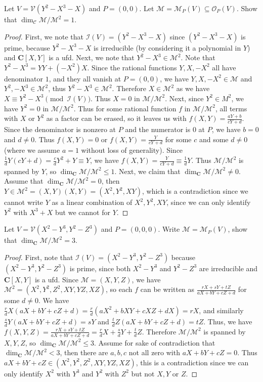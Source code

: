 \documentclass[11pt]{book}
\begin{document}
\begin{problem}
Let $V=\mathcal{V}(Y^2-X^3-X)$ and $P=(0,0)$. Let $\mathcal M=\mathcal{M}_P(V)\subseteq\mathcal{O}_P(V)$. Show that $\dim_{\mathcal C}\mathcal{M}/\mathcal{M}^2=1$.
\begin{proof}
First, we note that $\mathcal I(V)=(Y^2-X^3-X)$ since $(Y^2-X^3-X)$ is prime, because $Y^2-X^3-X$ is irreducible (by considering it a polynomial in $Y$) and $\mathbf C[X,Y]$ is a ufd. Next, we note that $Y^2-X^3\in\mathcal{M}^2$. Note that $Y^2-X^3=YY+(-X^2)X$. Since the rational functions $Y,X,-X^2$ all have denominator $1$, and they all vanish at $P=(0,0)$, we have $Y,X,-X^2\in\mathcal{M}$ and $Y^2,-X^3\in\mathcal{M}^2$, thus $Y^2-X^3\in\mathcal{M}^2$. Therefore $X\in \mathcal{M}^2$ as we have $X\equiv Y^2-X^3\pmod{\mathcal I(V)}$. Thus $X=0$ in $\mathcal{M}/\mathcal{M}^2$. Next, since $Y^2\in M^2$, we have $Y^2=0$ in $\mathcal{M}/\mathcal{M}^2$.  Thus for some rational function $f$ in $\mathcal{M}/\mathcal{M}^2$, all terms with $X$ or $Y^2$ as a factor can be erased, so it leaves us with $f(X,Y)=\frac{aY+b}{cY+d}$. Since the denominator is nonzero at $P$ and the numerator is $0$ at $P$, we have $b=0$ and $d\ne 0$. Thus $f(X,Y)=0$ or $f(X,Y)=\frac{Y}{cY+d}$ for some $c$ and some $d\ne 0$ (where we assume $a=1$ without loss of generality). Since $\frac{1}{d}Y(cY+d)=\frac{c}{d}Y^2+Y\equiv Y$, we have $f(X,Y)=\frac{Y}{cY+d}\equiv \frac{1}{d}Y$. Thus $\mathcal{M}/\mathcal{M}^2$ is spanned by $Y$, so $\dim_{\mathbf C}\mathcal{M}/\mathcal{M}^2\le 1$. Next, we claim that $\dim_{\mathbf C}\mathcal{M}/\mathcal{M}^2\ne 0$. Assume that $\dim_{\mathbf C}\mathcal{M}/\mathcal{M}^2= 0$, then $Y\in\mathcal{M}^2=(X,Y)(X,Y)=(X^2,Y^2,XY)$, which is a contradiction since we cannot write $Y$ as a linear combination of $X^2,Y^2,XY$, since we can only identify $Y^2$ with $X^3+X$ but we cannot for $Y$.
\end{proof}
\end{problem}
\begin{problem}
Let $V=\mathcal{V}(X^2-Y^3,Y^2-Z^3)$ and $P=(0,0,0)$. Write $\mathcal{M}=\mathcal M_P(V)$, show that $\dim_{\mathbf C}\mathcal{M}/\mathcal{M}^2=3$.
\begin{proof}
First, note that $\mathcal{I}(V)=(X^2-Y^3,Y^2-Z^3)$ because $(X^2-Y^3,Y^2-Z^3)$ is prime, since both $X^2-Y^3$ and $Y^2-Z^3$ are irreducible and $\mathbf C[X,Y]$ is a ufd. Since $\mathcal{M}=(X,Y,Z)$, we have $\mathcal{M}^2=(X^2,Y^2,Z^2,XY,YZ,XZ)$, so each $f$ can be written as $\frac{rX+sY+tZ}{aX+bY+cZ+d}$ for some $d\ne 0$. We have $\frac{r}{d}X(aX+bY+cZ+d)=\frac{r}{d}(aX^2+bXY+cXZ+dX)=rX$, and similarly $\frac{s}{d}Y(aX+bY+cZ+d)=sY$ and $\frac{t}{d}Z(aX+bY+cZ+d)=tZ$. Thus, we have $f(X,Y,Z)=\frac{rX+sY+tZ}{aX+bY+cZ+d}=\frac{r}{d}X+\frac{s}{d}Y+\frac{t}{d}Z$. Therefore $\mathcal{M}/\mathcal{M}^2$ is spanned by $X,Y,Z$, so $\dim_{\mathbf C}\mathcal{M}/\mathcal{M}^2\le 3$. Assume for sake of contradiction that $\dim_{\mathbf C}\mathcal{M}/\mathcal{M}^2< 3$, then there are $a,b,c$ not all zero with $aX+bY+cZ=0$. Thus $aX+bY+cZ\in (X^2,Y^2,Z^2,XY,YZ,XZ)$, this is a contradiction since we can only identify $X^2$ with $Y^3$ and $Y^2$ with $Z^2$ but not $X,Y$ or $Z$.
\end{proof}
\end{problem}
\end{document}
